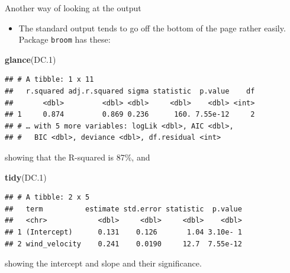 \documentclass[ignorenonframetext,]{beamer}
\newenvironment{Shaded}{\begin{snugshade}}{\end{snugshade}}
\newcommand{\FloatTok}[1]{\textcolor[rgb]{0.00,0.00,0.81}{#1}}
\newcommand{\KeywordTok}[1]{\textcolor[rgb]{0.13,0.29,0.53}{\textbf{#1}}}
\newcommand{\NormalTok}[1]{#1}
\providecommand{\tightlist}{%
  \setlength{\itemsep}{0pt}\setlength{\parskip}{0pt}}
\begin{document}
\begin{frame}[fragile]{Another way of looking at the output}
\protect\hypertarget{another-way-of-looking-at-the-output}{}

\begin{itemize}
\tightlist
\item
  The standard output tends to go off the bottom of the page rather
  easily. Package \texttt{broom} has these:
\end{itemize}

\footnotesize

\begin{Shaded}
\begin{Highlighting}[]
\KeywordTok{glance}\NormalTok{(DC}\FloatTok{.1}\NormalTok{)}
\end{Highlighting}
\end{Shaded}

\begin{verbatim}
## # A tibble: 1 x 11
##   r.squared adj.r.squared sigma statistic  p.value    df
##       <dbl>         <dbl> <dbl>     <dbl>    <dbl> <int>
## 1     0.874         0.869 0.236      160. 7.55e-12     2
## # … with 5 more variables: logLik <dbl>, AIC <dbl>,
## #   BIC <dbl>, deviance <dbl>, df.residual <int>
\end{verbatim}

\normalsize

showing that the R-squared is 87\%, and

\footnotesize

\begin{Shaded}
\begin{Highlighting}[]
\KeywordTok{tidy}\NormalTok{(DC}\FloatTok{.1}\NormalTok{)}
\end{Highlighting}
\end{Shaded}

\begin{verbatim}
## # A tibble: 2 x 5
##   term          estimate std.error statistic  p.value
##   <chr>            <dbl>     <dbl>     <dbl>    <dbl>
## 1 (Intercept)      0.131    0.126       1.04 3.10e- 1
## 2 wind_velocity    0.241    0.0190     12.7  7.55e-12
\end{verbatim}

\normalsize

showing the intercept and slope and their significance.

\end{frame}
\end{document}

